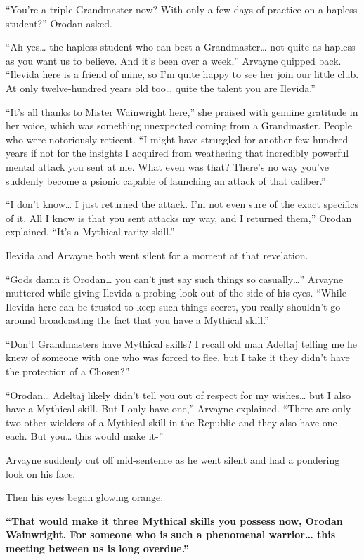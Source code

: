 \documentclass[a4paper,10pt]{book}
\begin{document}
“You’re a triple-Grandmaster now? With only a few days of practice on a hapless student?” Orodan asked.\par
“Ah yes… the hapless student who can best a Grandmaster… not quite as hapless as you want us to believe. And it’s been over a week,” Arvayne quipped back. “Ilevida here is a friend of mine, so I’m quite happy to see her join our little club. At only twelve-hundred years old too… quite the talent you are Ilevida.”\par
“It’s all thanks to Mister Wainwright here,” she praised with genuine gratitude in her voice, which was something unexpected coming from a Grandmaster. People who were notoriously reticent. “I might have struggled for another few hundred years if not for the insights I acquired from weathering that incredibly powerful mental attack you sent at me. What even was that? There’s no way you’ve suddenly become a psionic capable of launching an attack of that caliber.”\par
“I don’t know… I just returned the attack. I’m not even sure of the exact specifics of it. All I know is that you sent attacks my way, and I returned them,” Orodan explained. “It’s a Mythical rarity skill.”\par
Ilevida and Arvayne both went silent for a moment at that revelation.\par
“Gods damn it Orodan… you can’t just say such things so casually…” Arvayne muttered while giving Ilevida a probing look out of the side of his eyes. “While Ilevida here can be trusted to keep such things secret, you really shouldn’t go around broadcasting the fact that you have a Mythical skill.”\par
“Don’t Grandmasters have Mythical skills? I recall old man Adeltaj telling me he knew of someone with one who was forced to flee, but I take it they didn’t have the protection of a Chosen?”\par
“Orodan… Adeltaj likely didn’t tell you out of respect for my wishes… but I also have a Mythical skill. But I only have one,” Arvayne explained. “There are only two other wielders of a Mythical skill in the Republic and they also have one each. But you… this would make it-”\par
Arvayne suddenly cut off mid-sentence as he went silent and had a pondering look on his face.\par
Then his eyes began glowing orange.\par
\textbf{“That would make it three Mythical skills you possess now, Orodan Wainwright. For someone who is such a phenomenal warrior… this meeting between us is long overdue.”}\par
\end{document}
